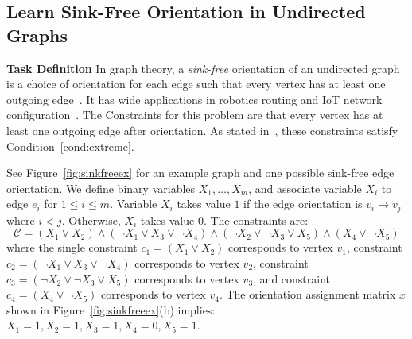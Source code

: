\documentclass[letterpaper]{article} %
\begin{document}
\subsection{Learn Sink-Free Orientation in Undirected Graphs}
\textbf{Task Definition} In graph theory, a \textit{sink-free} orientation of an undirected graph is a choice of orientation for each edge such that every vertex has at least one outgoing edge~\cite{DBLP:journals/combinatorics/CohnPP02}. It has wide applications in robotics routing and IoT network configuration~\cite{takahashi2009communication}.  The Constraints for this problem are that every vertex has at least one outgoing edge after orientation. As stated in~\cite{DBLP:journals/jacm/GuoJL19}, these constraints satisfy Condition~\ref{cond:extreme}.

{See Figure~\ref{fig:sinkfreeex} for an example graph and one possible sink-free edge orientation. We define binary variables $X_1,\ldots, X_m$, and associate variable $X_i$ to edge $e_i$ for $1\le i\le m$. Variable $X_i$ takes value $1$ if the edge orientation is $v_i\to v_j$ where $i<j$. Otherwise, $X_i$ takes value $0$. The constraints are:}
\begin{equation*}
\mathcal{C}=(X_1\vee X_2)\wedge(\neg X_1\vee X_3\vee\neg X_4)\wedge(\neg X_2\vee\neg X_3\vee X_5)\wedge(X_4\vee \neg X_5)
\end{equation*}
{where the single constraint  $c_1=(X_1\vee X_2)$ corresponds to vertex $v_1$, constraint $c_2=(\neg X_1\vee X_3\vee\neg X_4)$ corresponds to vertex  $v_2$, constraint $c_3=(\neg X_2\vee\neg X_3\vee X_5)$  corresponds to vertex  $v_3$, and constraint $c_4=(X_4\vee \neg X_5)$ corresponds to vertex  $v_4$. The orientation assignment matrix $x$ shown in Figure~\ref{fig:sinkfreeex}(b) implies: $X_1=1,X_2=1,X_3=1,X_4=0,X_5=1$.}
\end{document}
